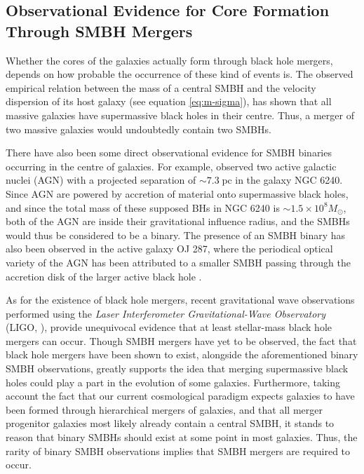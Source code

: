 \documentclass[english, oneside]{HYgradu}
\begin{document}
\subsection{Observational Evidence for Core Formation Through SMBH Mergers}

Whether the cores of the galaxies actually form through black hole mergers, depends on how probable the occurrence of these kind of events is. The observed empirical relation between the mass of a central SMBH and the velocity dispersion of its host galaxy (see equation \ref{eq:m-sigma}), has shown that all massive galaxies have supermassive black holes in their centre. Thus, a merger of two massive galaxies would undoubtedly contain two SMBHs. 

There have also been some direct observational evidence for SMBH binaries occurring in the centre of galaxies. For example, \cite{Rodriguez2006} observed two active galactic nuclei (AGN) with a projected separation of $\sim 7.3 \; \mathrm{pc}$ in the galaxy NGC 6240. Since AGN are powered by accretion of material onto supermassive black holes, and since the total mass of these supposed BHs in NGC 6240 is $\sim 1.5 \times 10^8 M_\odot$, both of the AGN are inside their gravitational influence radius, and the SMBHs would thus be considered to be a binary. The presence of an SMBH binary has also been observed in the active galaxy OJ 287, where the periodical optical variety of the AGN has been attributed to a smaller SMBH passing through the accretion disk of the larger active black hole \citep{MerrittBook}.

As for the existence of black hole mergers, recent gravitational wave observations performed using the \textit{Laser Interferometer Gravitational-Wave Observatory} (LIGO, \citealt{Abbott2016, Abbott2019}), provide unequivocal evidence that at least stellar-mass black hole mergers can occur. Though SMBH mergers have yet to be observed, the fact that black hole mergers have been shown to exist, alongside the aforementioned binary SMBH observations, greatly supports the idea that merging supermassive black holes could play a part in the evolution of some galaxies. Furthermore, taking account the fact that our current cosmological paradigm expects galaxies to have been formed through hierarchical mergers of galaxies, and that all merger progenitor galaxies most likely already contain a central SMBH, it stands to reason that binary SMBHs should exist at some point in most galaxies. Thus, the rarity of binary SMBH observations implies that SMBH mergers are required to occur.
\end{document}

